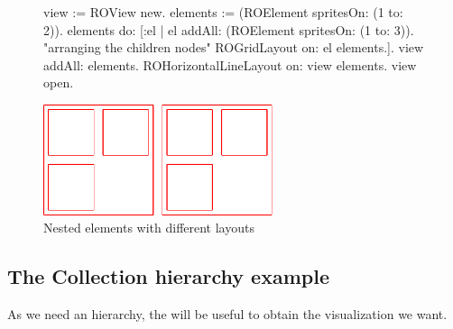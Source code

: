 \documentclass[a4paper,10pt,twoside]{book}
\begin{document}
\begin{figure}[H]
      \begin{minipage}[t]{0.61\textwidth}
      \vspace{0pt}
     \begin{code}{}
view := ROView new.
elements := (ROElement spritesOn: (1 to: 2)).
elements 
	do: [:el | el addAll: (ROElement spritesOn: (1 to: 3)). 
	           "arranging the children nodes"
			   ROGridLayout on: el elements.].			   
view addAll: elements.
ROHorizontalLineLayout on: view elements.
view open.
  \end{code}
   \end{minipage}
   \hfill
   \begin{minipage}[t]{0.5\textwidth}
      \vspace{0pt}\raggedright
       \centering
		\includegraphics[width=0.6\textwidth]{nestedLayout}
   \end{minipage}
\label{fig:nestedLayout}
\caption{Nested elements with different layouts }
\end{figure} 

\subsection*{The Collection hierarchy example}


 

As we need an hierarchy, the  will be useful to obtain the visualization we want.
\end{document}
